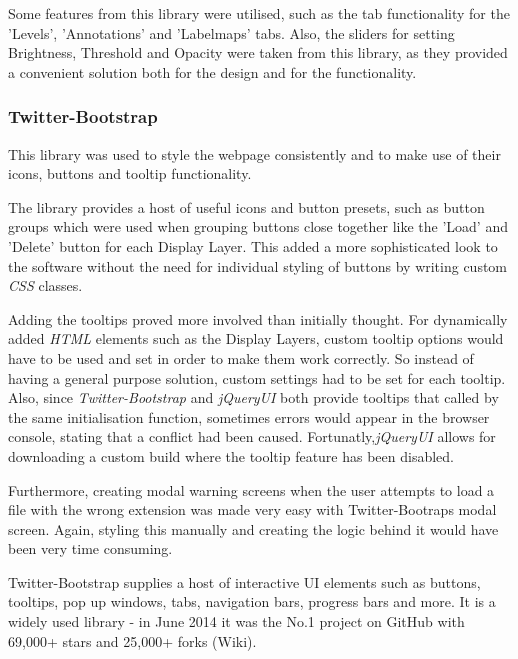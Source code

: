 \documentclass[a4paper,11pt,twoside]{article}
\begin{document}
Some features from this library were utilised, such as the tab functionality for the 'Levels', 'Annotations' and 'Labelmaps' tabs. Also, the sliders for setting Brightness, Threshold and Opacity were taken from this library, as they provided a convenient solution both for the design and for the functionality.


\subsubsection{Twitter-Bootstrap}

This library was used to style the webpage consistently and to make use of their icons, buttons and tooltip functionality.

The library provides a host of useful icons and button presets, such as button groups which were used when grouping buttons close together like the 'Load' and 'Delete' button for each Display Layer. This added a more sophisticated look to the software without the need for individual styling of buttons by writing custom \textit{CSS} classes.

Adding the tooltips proved more involved than initially thought. For dynamically added \textit{HTML} elements such as the Display Layers, custom tooltip options would have to be used and set in order to make them work correctly. So instead of having a general purpose solution, custom settings had to be set for each tooltip. Also, since \textit{Twitter-Bootstrap} and \textit{jQueryUI} both provide tooltips that called by the same initialisation function, sometimes errors would appear in the browser console, stating that a conflict had been caused. Fortunatly,\textit{jQueryUI} allows for downloading a custom build where the tooltip feature has been disabled.

Furthermore, creating modal warning screens when the user attempts to load a file with the wrong extension was made very easy with Twitter-Bootraps modal screen. Again, styling this manually and creating the logic behind it would have been very time consuming.

Twitter-Bootstrap supplies a host of interactive UI elements such as buttons, tooltips, pop up windows, tabs, navigation bars, progress bars and more. It is a widely used library - in June 2014 it was the No.1 project on GitHub with 69,000+ stars and 25,000+ forks (Wiki).
\end{document}
